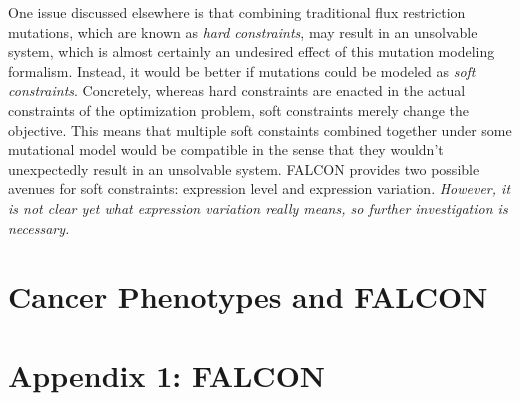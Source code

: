 \documentclass[phd,tocprelim,draft]{cornell}
\newcommand*{\commonDir}{../common/}   %
\begin{document}
One issue discussed elsewhere is that combining traditional flux
restriction mutations, which are known as \emph{hard constraints}, may
result in an unsolvable system, which is almost certainly an undesired
effect of this mutation modeling formalism. Instead, it would be
better if mutations could be modeled as \emph{soft
  constraints}. Concretely, whereas hard constraints are enacted in
the actual constraints of the optimization problem, soft constraints
merely change the objective. This means that multiple soft constaints
combined together under some mutational model would be compatible in
the sense that they wouldn't unexpectedly result in an unsolvable
system. FALCON provides two possible avenues for soft constraints:
expression level and expression variation. \emph{However, it is not
  clear yet what expression variation really means, so further
  investigation is necessary.}

\chapter{Cancer Phenotypes and FALCON}

\appendix

\chapter{Appendix 1: FALCON}




\end{document}
